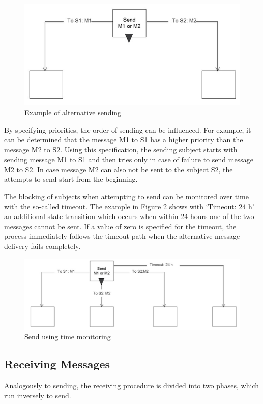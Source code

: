 \begin{figure}[ph]
	\centering
	\includegraphics[width=0.7\linewidth]{20181026-Ontologie-Bilder/Grafiken-Ontologie/SUbjectExecution/sendState}
	\caption[Example of alternative sending]{Example of alternative sending}
	\label{fig:sendstate}
\end{figure}

By specifying priorities, the order of sending can be influenced. For example, it can be determined that the message M1 to S1 has a higher priority than the message M2 to S2. Using this specification, the sending subject starts with sending message M1 to S1 and then tries only in case of failure to send message M2 to S2. In case message M2 can also not be sent to the subject S2, the attempts to send start from the beginning.

The blocking of subjects when attempting to send can be monitored over time with the so-called timeout. The example in Figure \ref{fig:sendstatetimer} shows with ‘Timeout: 24 h’ an additional state transition which occurs when within 24 hours one of the two messages cannot be sent. If a value of zero is specified for the timeout, the process immediately follows the timeout path when the alternative message delivery fails completely.

\begin{figure}[ph]
	\centering
	\includegraphics[width=0.7\linewidth]{20181026-Ontologie-Bilder/Grafiken-Ontologie/SUbjectExecution/SendSTateTimer}
	\caption[Send using time monitoring]{Send using time monitoring}
	\label{fig:sendstatetimer}
\end{figure}


\subsection{Receiving Messages}
Analogously to sending, the receiving procedure is divided into two phases, which run inversely to send.


